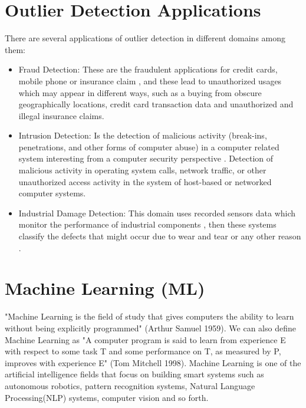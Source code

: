 \section{Outlier Detection Applications}
There are several applications of outlier detection in different domains among them:
\begin{itemize}
\item{Fraud Detection:} 
These are the fraudulent applications for credit cards, mobile phone or insurance claim \citep{Kurukshetra}, and these lead to unauthorized usages which may appear in different ways, such as a buying from obscure geographically locations, credit card transaction data and unauthorized and illegal insurance claims. %
\item{Intrusion Detection:} 
Is the detection of malicious activity (break-ins, penetrations, and other forms of computer abuse) in a computer related system interesting from a computer security perspective \citep{Survey}.
Detection of malicious activity in operating system calls, network traffic, or other unauthorized access activity in the system of host-based or networked computer systems.
\item{Industrial Damage Detection:}
This domain uses recorded sensors data which monitor the performance of industrial components \citep{Kurukshetra}, then these systems classify the defects that might occur due to wear and tear or any other reason \citep{Survey}.
\end{itemize}
\section{Machine Learning (ML)}
"Machine Learning is the field of study that gives computers the ability to learn without being explicitly programmed" (Arthur Samuel 1959). We can also define Machine Learning as "A computer program is said to learn from experience E with respect to some task T and some performance on T, as measured by P, improves with  experience E" (Tom Mitchell 1998). Machine Learning is one of the artificial intelligence fields that focus on building smart systems such as autonomous robotics, pattern recognition systems, Natural Language Processing(NLP) systems, computer vision and so forth.

